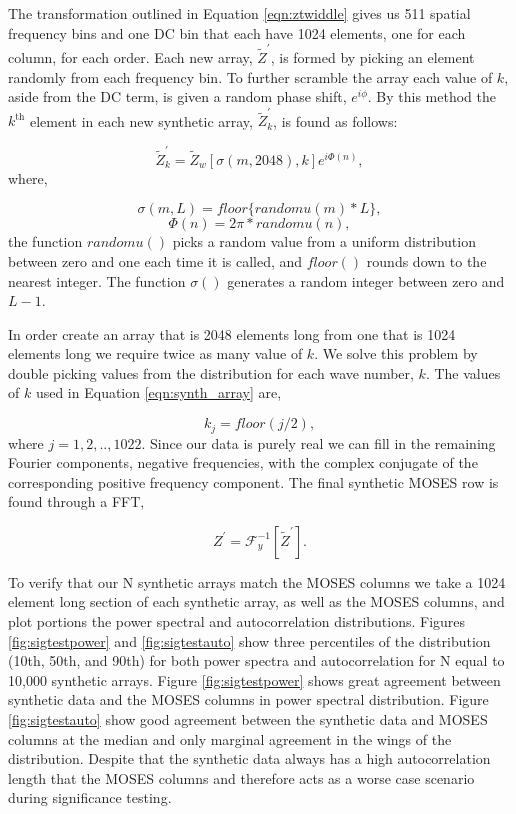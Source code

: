 \documentclass[]{solarphysics}
\begin{document}
\begin{article}
	The transformation outlined in Equation \ref{eqn:ztwiddle} gives us 511 spatial frequency bins and one DC bin that each have 1024 elements, one for each column, for each order.  Each new array, $\widetilde{Z}^{'}$, is formed by picking an element randomly from each frequency bin. To further scramble the array each value of $k$, aside from the DC term, is given a random phase shift, $e^{i\phi}$.  By this method the $k^{\mathrm{th}}$ element in each new synthetic array, $\widetilde{Z}_k^{'}$, is found as follows:
	
	\begin{equation}
		\widetilde{Z}_k^{'} = \widetilde{Z}_w\left[\sigma(m,2048), k  \right]e^{i\Phi(n)} ,
		\label{eqn:synth_array}
	\end{equation}
	where,
	
	\begin{equation}
		\sigma(m,L) = floor\{randomu(m)*L\} ,
	\end{equation}
	\begin{equation}
		\Phi(n) = 2\pi * randomu(n),
	\end{equation}
	the function $randomu()$ picks a random value from a uniform distribution between zero and one each time it is called, and $floor()$ rounds down to the nearest integer.  The function $\sigma()$ generates a random integer between zero and $L-1$.  
	
	In order create an array that is 2048 elements long from one that is 1024 elements long we require twice as many value of $k$.  We solve this problem by double picking values from the distribution for each wave number, $k$.  The values of $k$ used in Equation \ref{eqn:synth_array} are,
	
	\begin{equation}
		k_j = floor(j/2),
	\end{equation}
	where $j = 1,2,..,1022.$ Since our data is purely real we can fill in the remaining Fourier components,  negative frequencies, with the complex conjugate of the corresponding positive frequency component.  The final synthetic MOSES row is found through a FFT, 
	
	\begin{equation}
		Z^{'} = \mathcal{F}_y^{-1}[\widetilde{Z}^{'}].
	\end{equation}

	To verify that our N synthetic arrays match the MOSES columns we take a 1024 element long section of each synthetic array, as well as the MOSES columns, and plot portions the power spectral and autocorrelation distributions. Figures \ref{fig:sigtestpower} and \ref{fig:sigtestauto}  show three percentiles of the distribution (10th, 50th, and 90th) for both power spectra and autocorrelation for N equal to 10,000 synthetic arrays. Figure \ref{fig:sigtestpower} shows great agreement between synthetic data and the MOSES columns in power spectral distribution.  Figure \ref{fig:sigtestauto} show good agreement between the synthetic data and MOSES columns at the median and only marginal agreement in the wings of the distribution.  Despite that the synthetic data always has a high autocorrelation length that the MOSES columns and therefore acts as a worse case scenario during significance testing.  
		

\end{article}
\end{document}
